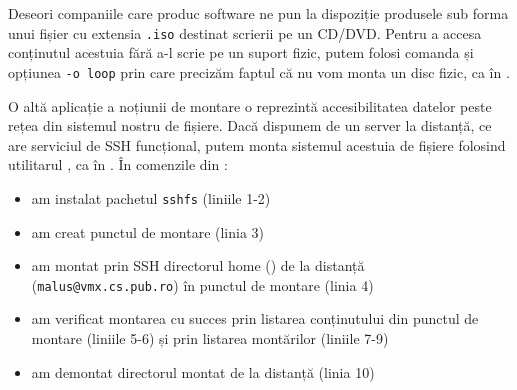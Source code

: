 Deseori companiile care produc software ne pun la dispoziție produsele sub
forma unui fișier cu extensia \texttt{.iso} destinat scrierii pe un CD/DVD.
Pentru a accesa conținutul acestuia fără a-l scrie pe un suport fizic, putem
folosi comanda  și opțiunea \texttt{-o loop} prin care precizăm
faptul că nu vom monta un disc fizic, ca în .


O altă aplicație a noțiunii de montare o reprezintă accesibilitatea datelor
peste rețea din sistemul nostru de fișiere. Dacă dispunem de un server la
distanță, ce are serviciul de SSH funcțional, putem monta sistemul acestuia de
fișiere folosind utilitarul , ca în .
În comenzile din :
\begin{itemize}
  \item am instalat pachetul \texttt{sshfs} (liniile 1-2)
  \item am creat punctul de montare  (linia 3)
  \item am montat prin SSH directorul home () de la distanță (\texttt{malus@vmx.cs.pub.ro}) în punctul de montare (linia 4)
  \item am verificat montarea cu succes prin listarea conținutului din punctul de montare (liniile 5-6) și prin listarea montărilor (liniile 7-9)
  \item am demontat directorul montat de la distanță (linia 10)
\end{itemize}

